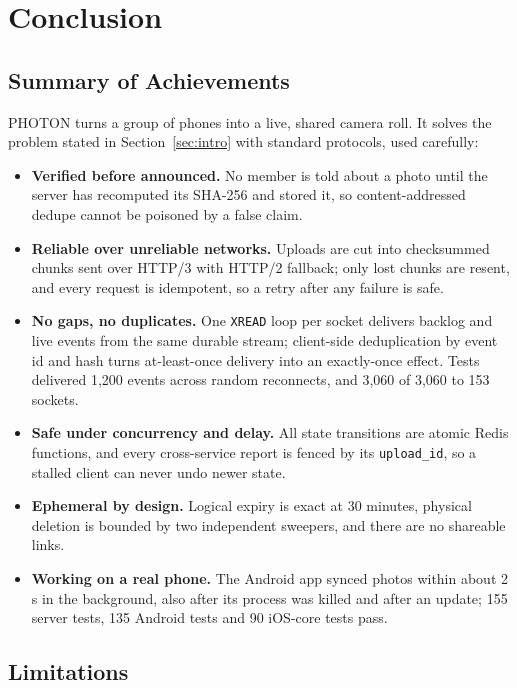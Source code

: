 \section{Conclusion}\label{sec:conclusion}

\subsection{Summary of Achievements}

PHOTON turns a group of phones into a live, shared camera roll. It solves the problem stated in Section~\ref{sec:intro} with standard protocols, used carefully:

\begin{itemize}
  \item \textbf{Verified before announced.} No member is told about a photo until the server has recomputed its SHA-256 and stored it, so content-addressed dedupe cannot be poisoned by a false claim.
  \item \textbf{Reliable over unreliable networks.} Uploads are cut into checksummed chunks sent over HTTP/3 with HTTP/2 fallback; only lost chunks are resent, and every request is idempotent, so a retry after any failure is safe.
  \item \textbf{No gaps, no duplicates.} One \texttt{XREAD} loop per socket delivers backlog and live events from the same durable stream; client-side deduplication by event id and hash turns at-least-once delivery into an exactly-once effect. Tests delivered 1{,}200 events across random reconnects, and 3{,}060 of 3{,}060 to 153 sockets.
  \item \textbf{Safe under concurrency and delay.} All state transitions are atomic Redis functions, and every cross-service report is fenced by its \texttt{upload\_id}, so a stalled client can never undo newer state.
  \item \textbf{Ephemeral by design.} Logical expiry is exact at 30 minutes, physical deletion is bounded by two independent sweepers, and there are no shareable links.
  \item \textbf{Working on a real phone.} The Android app synced photos within about 2\,s in the background, also after its process was killed and after an update; 155 server tests, 135 Android tests and 90 iOS-core tests pass.
\end{itemize}

\subsection{Limitations}

